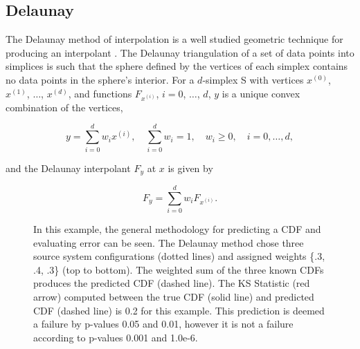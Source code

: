 \documentclass[letterpaper, 10 pt, conference]{ieeeconf}  %
\begin{document}
\subsection{Delaunay}
\label{sec:delaunay}

The Delaunay method of interpolation is a well studied geometric technique for producing an interpolant \cite{lee1980two}. The Delaunay triangulation of a set of data points into simplices is such that the sphere defined by the vertices of each simplex contains no data points in the sphere's interior. For a $d$-simplex S with vertices $x^{(0)}$, $x^{(1)}$, $\ldots$, $x^{(d)}$, and functions $F_{x^{(i)}}$, $i=0$, $\ldots$, $d$, $y$ is a unique convex combination of the vertices,

$$ y = \sum_{i=0}^{d} w_i x^{(i)}, \quad \sum_{i=0}^{d} w_i = 1, \quad w_i \geq 0, \quad i=0,\ldots,d, $$

and the Delaunay interpolant $F_y$ at $x$ is given by

$$ F_y = \sum_{i=0}^{d} w_i F_{x^{(i)}}. $$

\begin{figure}[htb]
  \vspace{-0.3cm}
  \caption{In this example, the general methodology for predicting a CDF and evaluating error can be seen. The Delaunay method chose three source system configurations (dotted lines) and assigned weights \{.3, .4, .3\} (top to bottom). The weighted sum of the three known CDFs produces the predicted CDF (dashed line). The KS Statistic (red arrow) computed between the true CDF (solid line) and predicted CDF (dashed line) is 0.2 for this example. This prediction is deemed a failure by p-values 0.05 and 0.01, however it is not a failure according to p-values 0.001 and 1.0e-6.
  \vspace{-.1cm}}
  \label{fig:prediction_example}
\end{figure}
\end{document}
